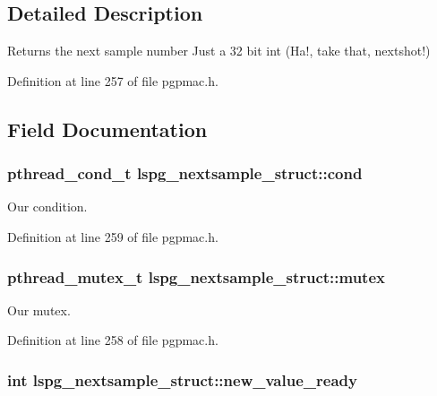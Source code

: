 \subsection{Detailed Description}
Returns the next sample number Just a 32 bit int (Ha!, take that, nextshot!) 

Definition at line 257 of file pgpmac.\-h.



\subsection{Field Documentation}
\hypertarget{structlspg__nextsample__struct_a5b46e4537dac3be839f6c3eeff6b46b6}{
\subsubsection[{cond}]{\setlength{\rightskip}{0pt plus 5cm}pthread\-\_\-cond\-\_\-t lspg\-\_\-nextsample\-\_\-struct\-::cond}}\label{structlspg__nextsample__struct_a5b46e4537dac3be839f6c3eeff6b46b6}


Our condition. 



Definition at line 259 of file pgpmac.\-h.

\hypertarget{structlspg__nextsample__struct_a99408b5825e2510f07be199d2cdc3633}{
\subsubsection[{mutex}]{\setlength{\rightskip}{0pt plus 5cm}pthread\-\_\-mutex\-\_\-t lspg\-\_\-nextsample\-\_\-struct\-::mutex}}\label{structlspg__nextsample__struct_a99408b5825e2510f07be199d2cdc3633}


Our mutex. 



Definition at line 258 of file pgpmac.\-h.

\hypertarget{structlspg__nextsample__struct_ab1c9e9d3dc5140137a7ccf908e95f69e}{
\subsubsection[{new\-\_\-value\-\_\-ready}]{\setlength{\rightskip}{0pt plus 5cm}int lspg\-\_\-nextsample\-\_\-struct\-::new\-\_\-value\-\_\-ready}}\label{structlspg__nextsample__struct_ab1c9e9d3dc5140137a7ccf908e95f69e}



